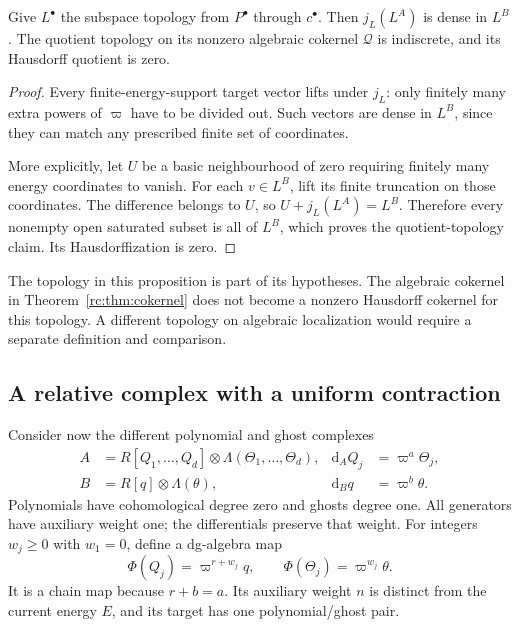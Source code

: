 \begin{proposition}\label{rc:prop:dense}
Give \(L^\bullet\) the subspace topology from \(P^\bullet\)
through \(c^\bullet\).  Then \(j_L(L^A)\) is dense in \(L^B\).
The quotient topology on its nonzero algebraic cokernel
\(\mathcal Q\) is indiscrete, and its Hausdorff quotient is zero.
\end{proposition}
\begin{proof}
Every finite-energy-support target vector lifts under \(j_L\):
only finitely many extra powers of \(\varpi\) have to be
divided out.  Such vectors are dense in \(L^B\), since they
can match any prescribed finite set of coordinates.

More explicitly, let \(U\) be a basic neighbourhood of zero
requiring finitely many energy coordinates to vanish.
For each \(v\in L^B\), lift its finite truncation on those
coordinates.  The difference belongs to \(U\), so
\(U+j_L(L^A)=L^B\).  Therefore every nonempty open saturated
subset is all of \(L^B\), which proves the quotient-topology
claim.  Its Hausdorffization is zero.
\end{proof}

The topology in this proposition is part of its hypotheses.
The algebraic cokernel in Theorem~\ref{rc:thm:cokernel}
does not become a nonzero Hausdorff cokernel for this topology.
A different topology on algebraic localization would require
a separate definition and comparison.

\subsection{A relative complex with a uniform contraction}

Consider now the different polynomial and ghost complexes
\begin{equation}\label{rc:eq:relative-complexes}
\begin{aligned}
 A&=R[Q_1,\ldots,Q_d]\otimes\Lambda(\Theta_1,\ldots,\Theta_d),
 &\mathrm d_AQ_j&=\varpi^a\Theta_j,\\
 B&=R[q]\otimes\Lambda(\theta),
 &\mathrm d_Bq&=\varpi^b\theta.
\end{aligned}
\end{equation}
Polynomials have cohomological degree zero and ghosts degree
one.  All generators have auxiliary weight one; the
differentials preserve that weight.  For integers \(w_j\geq0\)
with \(w_1=0\), define a dg-algebra map
\begin{equation}\label{rc:eq:relative-map}
 \Phi(Q_j)=\varpi^{r+w_j}q,\qquad
 \Phi(\Theta_j)=\varpi^{w_j}\theta.
\end{equation}
It is a chain map because \(r+b=a\).
Its auxiliary weight \(n\) is distinct from the current energy
\(E\), and its target has one polynomial/ghost pair.

